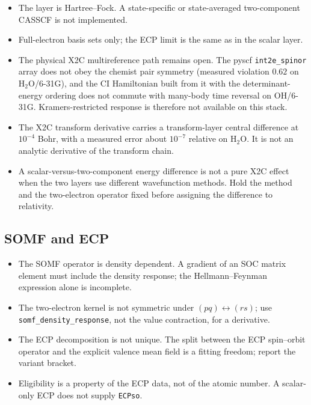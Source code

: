 \begin{itemize}
\item The layer is Hartree--Fock.  A state-specific or state-averaged
  two-component CASSCF is not implemented.
\item Full-electron basis sets only; the ECP limit is the same as in
  the scalar layer.
\item The physical X2C multireference path remains open.  The pyscf
  \texttt{int2e\_spinor} array does not obey the chemist pair symmetry
  (measured violation $0.62$ on H$_2$O/6-31G), and the CI Hamiltonian
  built from it with the determinant-energy ordering does not commute
  with many-body time reversal on OH/6-31G.  Kramers-restricted
  response is therefore not available on this stack.
\item The X2C transform derivative carries a transform-layer central
  difference at $10^{-4}$ Bohr, with a measured error about $10^{-7}$
  relative on H$_2$O.  It is not an analytic derivative of the
  transform chain.
\item A scalar-versus-two-component energy difference is not a pure
  X2C effect when the two layers use different wavefunction methods.
  Hold the method and the two-electron operator fixed before assigning
  the difference to relativity.
\end{itemize}

\subsection{SOMF and ECP}

\begin{itemize}
\item The SOMF operator is density dependent.  A gradient of an SOC
  matrix element must include the density response; the
  Hellmann--Feynman expression alone is incomplete.
\item The two-electron kernel is not symmetric under
  $(pq)\leftrightarrow(rs)$; use \texttt{somf\_density\_response},
  not the value contraction, for a derivative.
\item The ECP decomposition is not unique.  The split between the ECP
  spin--orbit operator and the explicit valence mean field is a fitting
  freedom; report the variant bracket.
\item Eligibility is a property of the ECP data, not of the atomic
  number.  A scalar-only ECP does not supply \texttt{ECPso}.
\end{itemize}

